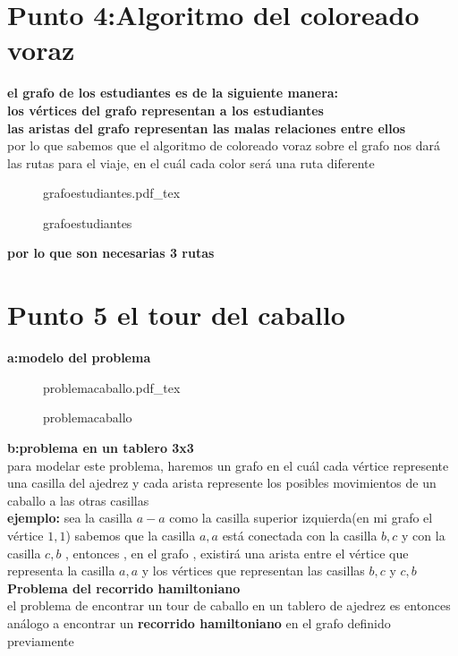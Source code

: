 \documentclass[10pt,a4paper]{article} %
\newcommand{\incfig}[1]{%
    \def\svgwidth{\columnwidth}
    {#1.pdf_tex}
}
\begin{document}
    \section{Punto 4:Algoritmo del coloreado voraz}
    \textbf{el grafo de los estudiantes es de la siguiente manera:}
    \\
    \textbf{los vértices del grafo representan a los estudiantes}
    \\
    \textbf{las aristas del grafo representan las malas relaciones entre ellos}
    \\
    por lo que sabemos que el algoritmo de coloreado voraz sobre el grafo nos
    dará las rutas para el viaje, en el cuál cada color será una ruta diferente
    \begin{figure}[ht]
        \centering
        \incfig{grafoestudiantes}
        \caption{grafoestudiantes}
        \label{fig:grafoestudiantes}
    \end{figure}
    \textbf{por lo que son necesarias 3 rutas}


    \section{Punto 5 el tour del caballo}
    \textbf{a:modelo del problema}
\begin{figure}[ht]
    \centering
    \incfig{problemacaballo}
    \caption{problemacaballo}
    \label{fig:problemacaballo}
\end{figure}



    \textbf{b:problema en un tablero 3x3}
    \\
    para modelar este problema, haremos un grafo en el cuál cada vértice
    represente una casilla del ajedrez y cada arista represente los posibles
    movimientos de un caballo a las otras casillas
    \\
    \textbf{ejemplo:} sea la casilla $a-a$ como la casilla superior
    izquierda(en mi grafo el vértice $1,1$) sabemos que la casilla $a,a$ está
    conectada con la casilla $b,c$ y con la casilla $c,b$ , entonces , en el
    grafo , existirá una arista entre el vértice que representa la casilla
    $a,a$ y los vértices que representan las casillas $b,c$ y $c,b$
    \\
    \textbf{Problema del recorrido hamiltoniano}
    \\
    el problema de encontrar  un tour de caballo en un tablero de ajedrez es
    entonces análogo a encontrar un \textbf{recorrido hamiltoniano}  en el grafo definido
    previamente
\end{document}
